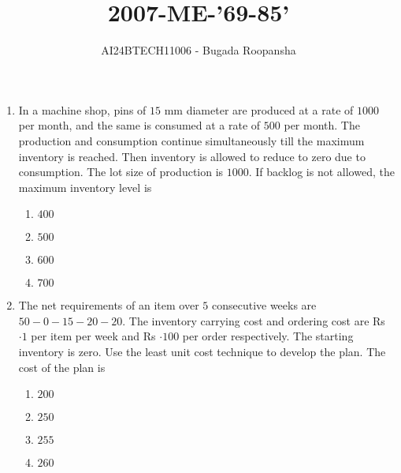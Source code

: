 \documentclass[journal,12pt,twocolumn]{IEEEtran}
\theoremstyle{remark}
\begin{document}
                        
                        \vspace{3cm}
                        \title{2007-ME-'69-85'}
                        \author{AI24BTECH11006 - Bugada Roopansha}
                        \maketitle
                        \begin{enumerate}[start=69]
                        \item In a machine shop, pins of $15$ mm diameter are produced at a rate of $1000$ per month, and the same is consumed at a rate of $500$ per month. The production and consumption continue simultaneously till the maximum inventory is reached. Then inventory is allowed to reduce to zero due to consumption. The lot size of production is $1000$. If backlog is not allowed, the maximum inventory level is
                        \begin{enumerate}
                            \item $400$
                            \item $500$
                            \item $600$
                            \item $700$
                        \end{enumerate}
                        \item The net requirements of an item over $5$ consecutive weeks are $50-0-15-20-20$. The inventory carrying cost and ordering cost are Rs $\cdot1$ per item per week and Rs $\cdot100$ per order respectively. The starting inventory is zero. Use the least unit cost technique to develop the plan. The cost of the plan  is
                            \begin{enumerate}
                                \item $200$
                                \item $250$
                                \item $255$
                                \item $260$
                            \end{enumerate}

\end{enumerate}
\end{document}
